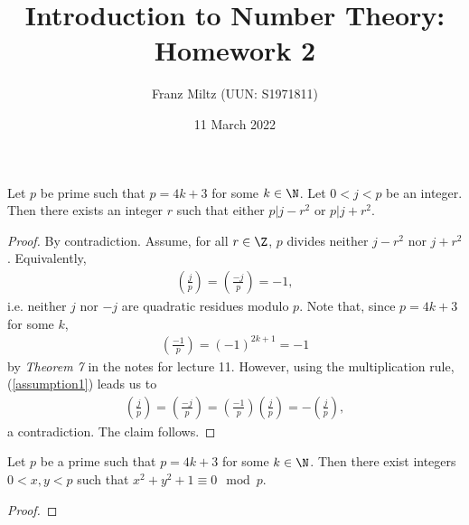 \documentclass{article}
\begin{document}
\title{Introduction to Number Theory: Homework 2}
\author{Franz Miltz (UUN: S1971811)}
\date{11 March 2022}
\maketitle

\begin{claim*}[1]
   Let $p$ be prime such that $p=4k+3$ for some $k\in\N$. Let $0<j<p$ be an integer. Then 
   there exists an integer $r$ such that either $p|j-r^2$ or $p|j+r^2$.
   \begin{proof}
      By contradiction. Assume, for all $r\in\Z$, $p$ divides neither $j-r^2$ nor $j+r^2$. 
      Equivalently, 
      \begin{align}
         \label{assumption1}
         \left(\frac{j}{p}\right)=\left(\frac{-j}{p}\right)=-1,
      \end{align}
      i.e. neither $j$ nor $-j$ are quadratic residues modulo $p$. Note that, since $p=4k+3$
      for some $k$, 
      \begin{align*}
         \left(\frac{-1}{p}\right)=(-1)^{2k+1}=-1
      \end{align*}
      by \emph{Theorem 7} in the notes for lecture 11. However, using the multiplication rule,
      (\ref{assumption1}) leads us to
      \begin{align*}
         \left(\frac{j}{p}\right) = \left(\frac{-j}{p}\right) 
                                  = \left(\frac{-1}{p}\right)\left(\frac{j}{p}\right)
                                  = -\left(\frac{j}{p}\right),
      \end{align*}
      a contradiction. The claim follows.
   \end{proof}
\end{claim*}

\begin{claim*}[2]
   Let $p$ be a prime such that $p=4k+3$ for some $k\in\N$. Then there exist 
   integers $0<x,y<p$ such that $x^2+y^2+1\equiv 0\mod p$.
   \begin{proof}
   \end{proof}
\end{claim*}
\end{document}
